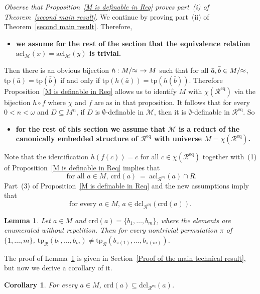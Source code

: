 \documentclass[11pt, twoside]{amsart}
\newtheorem{lem}[theor]{Lemma}
\newtheorem{cor}[theor]{Corollary}
\numberwithin{equation}{section}
\newcommand{\tp}{\mathrm{tp}}
\newcommand{\acl}{\mathrm{acl}}
\newcommand{\dcl}{\mathrm{dcl}}
\newcommand{\es}{\emptyset}
\newcommand{\nts}{\negthickspace}
\newcommand{\approxc}{\nts \approx}
\newcommand{\crd}{\mathrm{crd}}
\newcommand{\meq}{^{\mathrm{eq}}}
\newcommand{\mcM}{\mathcal{M}}
\newcommand{\mcR}{\mathcal{R}}
\begin{document}
\noindent
{\em Observe that Proposition~\ref{M is definable in Req} proves part~(i) of Theorem~\ref{second main result}.}
We continue by proving part~(ii) of Theorem~\ref{second main result}.
Therefore,
\begin{itemize}
\item[] {\bf we assume for the rest of the section that the equivalence relation $\acl_\mcM(x) = \acl_\mcM(y)$ is trivial.}
\end{itemize}
Then there is an obvious bijection $h : M / \approxc \ \to M$ such that for all 
$\bar{a}, \bar{b} \in M / \approxc$, $\tp(\bar{a}) = \tp(\bar{b})$ if and only if
$\tp(h(\bar{a})) = \tp(h(\bar{b}))$.
Therefore Proposition~\ref{M is definable in Req} allows us to identify $M$ with $\chi(\mcR\meq)$ via the bijection $h \circ f$ where 
$\chi$ and $f$ are as in that proposition.
It follows that for every $0 < n < \omega$ and $D \subseteq M^n$, if $D$ is $\es$-definable in $\mcM$, then
it is $\es$-definable in $\mcR\meq$. 
So 
\begin{itemize}
\item[] {\bf for the rest of this section we assume that $\mcM$ is a reduct of the canonically embedded structure of $\mcR\meq$ 
with universe $M = \chi(\mcR\meq)$.}
\end{itemize}
Note that the identification $h(f(c)) = c$
for all $c \in \chi(\mcR\meq)$ together with~(1) of Proposition~\ref{M is definable in Req} implies that
\[\text{ for all $a \in M$}, \ \crd(a) \ = \ \acl_{\mcR\meq}(a) \cap R.\]
Part~(3) of Proposition~\ref{M is definable in Req} and the new assumptions imply that
\begin{equation}\label{a is in definable closure of acl(a) cut with R}
\text{for every $a \in M$, $a \in \dcl_{\mcR\meq}(\crd(a))$.}
\end{equation}


\begin{lem}\label{crd(a) is rigid}
Let $a \in M$ and $\crd(a)  = \{b_1, \ldots, b_m\}$, where the elements are enumerated without repetition.
Then for every nontrivial permutation $\pi$ of $\{1, \ldots, m\}$,
$\tp_\mcR(b_1, \ldots, b_m) \neq \tp_\mcR(b_{\pi(1)}, \ldots, b_{\pi(m)})$.
\end{lem}

\noindent
The proof of Lemma~\ref{crd(a) is rigid} is given in Section~\ref{Proof of the main technical result},
but now we derive a corollary of it.

\begin{cor}\label{crd is in dcl of a}
For every  $a \in M$, $\crd(a) \subseteq \dcl_{\mcR\meq}(a)$.
\end{cor}
\end{document}
